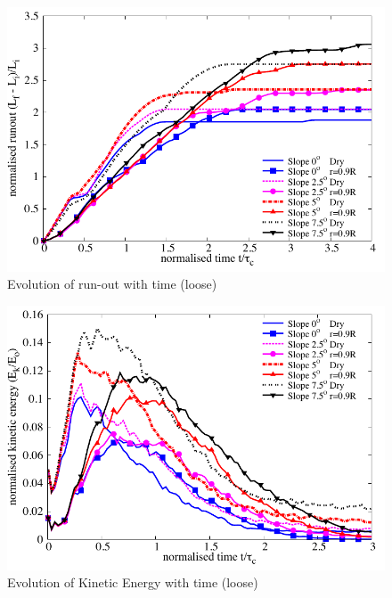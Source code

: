\begin{figure}
\centering
\includegraphics[width=0.97\columnwidth]{Runout_loose}
\caption{Evolution of run-out with time (loose)}
\label{fig:run_loose}
\end{figure}


\begin{figure}
\centering
\includegraphics[width=0.97\columnwidth]{KE_loose}
\caption{Evolution of Kinetic Energy with time (loose)}
\label{fig:KE_loose}
\end{figure}

